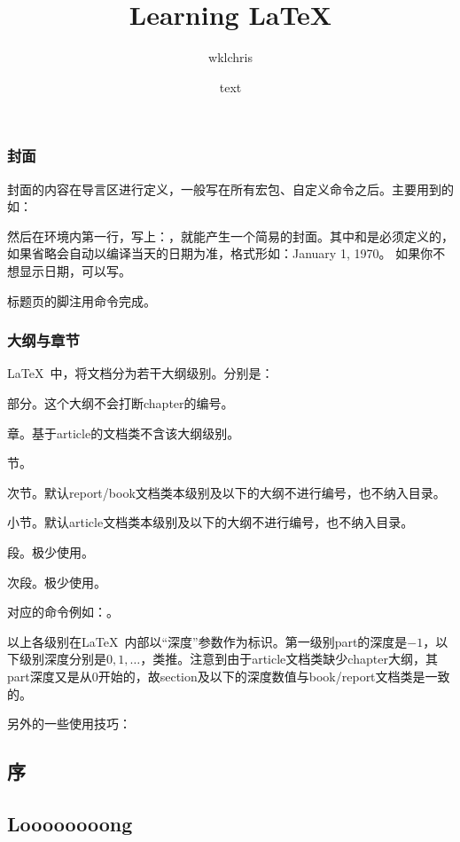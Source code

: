 \subsection{封面}
封面的内容在导言区进行定义，一般写在所有宏包、自定义命令之后。主要用到的如：
\begin{latex}
\title{Learning LaTeX}
\author{wklchris}
\date{text}
\end{latex}

然后在环境内第一行，写上：，就能产生一个简易的封面。其中和是必须定义的，如果省略会自动以编译当天的日期为准，格式形如：January 1, 1970。 如果你不想显示日期，可以写。

标题页的脚注用命令完成。

\subsection{大纲与章节}
\LaTeX\ 中，将文档分为若干大纲级别。分别是：
\begin{para}
\item[\latexline{part}] 部分。这个大纲不会打断chapter的编号。
\item[\latexline{chapter}] 章。基于article的文档类不含该大纲级别。
\item[\latexline{section}] 节。
\item[\latexline{subsection}] 次节。默认report/book文档类本级别及以下的大纲不进行编号，也不纳入目录。
\item[\latexline{subsubsection}] 小节。默认article文档类本级别及以下的大纲不进行编号，也不纳入目录。
\item[\latexline{paragraph}] 段。极少使用。
\item[\latexline{subparagraph}] 次段。极少使用。
\end{para}

对应的命令例如：。

以上各级别在\LaTeX\ 内部以“深度”参数作为标识。第一级别part的深度是$-1$，以下级别深度分别是$0,1,\ldots$，类推。注意到由于article文档类缺少chapter大纲，其part深度又是从$0$开始的，故section及以下的深度数值与book/report文档类是一致的。\dpar

另外的一些使用技巧：
\begin{latex}
\setcounter{tocdepth}{2}
\chapter*{序}
\section[Short]{Loooooooong}
\renewcommand{\chaptername}{CHAPTER}
\end{latex}

